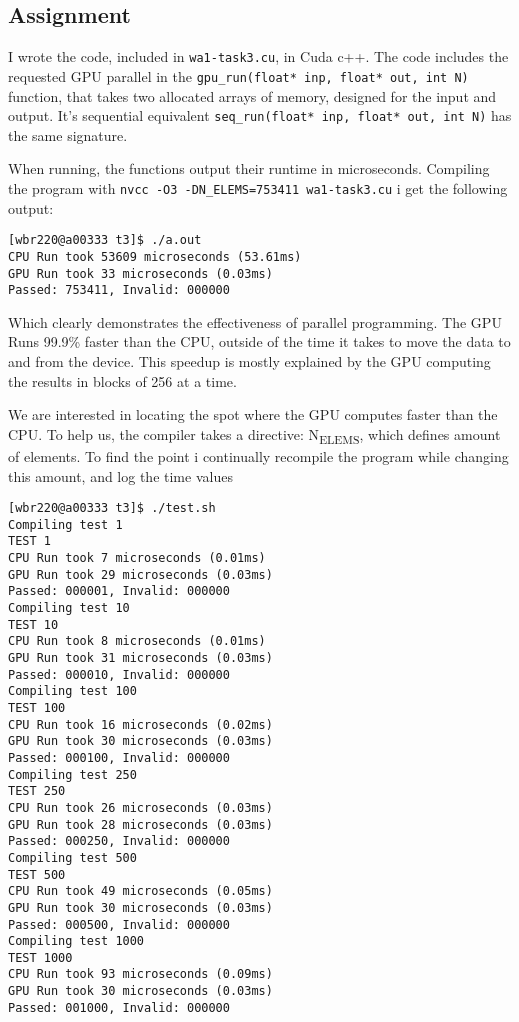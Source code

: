 \documentclass[11pt]{article}
\begin{document}
\subsection{Assignment}
\label{sec:orgb6a4614}

I wrote the code, included in \texttt{wa1-task3.cu}, in Cuda c++. The code includes the requested
GPU parallel in the \texttt{gpu\_run(float* inp, float* out, int N)} function, that takes two
allocated arrays of memory, designed for the input and output. It's sequential equivalent
\texttt{seq\_run(float* inp, float* out, int N)} has the same signature.  

When running, the functions output their runtime in microseconds. Compiling the program
with \texttt{nvcc -O3 -DN\_ELEMS=753411 wa1-task3.cu} i get the following output:
\begin{verbatim}
[wbr220@a00333 t3]$ ./a.out
CPU Run took 53609 microseconds (53.61ms)
GPU Run took 33 microseconds (0.03ms)
Passed: 753411, Invalid: 000000
\end{verbatim}
Which clearly demonstrates the effectiveness of parallel programming. The GPU Runs 99.9\%
faster than the CPU, outside of the time it takes to move the data to and from the device.
This speedup is mostly explained by the GPU computing the results in blocks of 256 at a
time.

We are interested in locating the spot where the GPU computes faster than the CPU. To
help us, the compiler takes a directive: N\textsubscript{ELEMS}, which defines amount of elements. To
find the point i continually recompile the program while changing this amount, and log the
time values
\begin{verbatim}
[wbr220@a00333 t3]$ ./test.sh
Compiling test 1
TEST 1
CPU Run took 7 microseconds (0.01ms)
GPU Run took 29 microseconds (0.03ms)
Passed: 000001, Invalid: 000000
Compiling test 10
TEST 10
CPU Run took 8 microseconds (0.01ms)
GPU Run took 31 microseconds (0.03ms)
Passed: 000010, Invalid: 000000
Compiling test 100
TEST 100
CPU Run took 16 microseconds (0.02ms)
GPU Run took 30 microseconds (0.03ms)
Passed: 000100, Invalid: 000000
Compiling test 250
TEST 250
CPU Run took 26 microseconds (0.03ms)
GPU Run took 28 microseconds (0.03ms)
Passed: 000250, Invalid: 000000
Compiling test 500
TEST 500
CPU Run took 49 microseconds (0.05ms)
GPU Run took 30 microseconds (0.03ms)
Passed: 000500, Invalid: 000000
Compiling test 1000
TEST 1000
CPU Run took 93 microseconds (0.09ms)
GPU Run took 30 microseconds (0.03ms)
Passed: 001000, Invalid: 000000
\end{verbatim}
\end{document}
